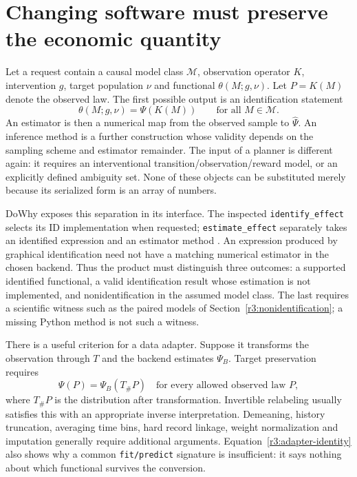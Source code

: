 \section{Changing software must preserve the economic quantity}
\label{r3:software-types}

Let a request contain a causal model class $\mathcal M$, observation operator
$K$, intervention $g$, target population $\nu$ and functional
$\theta(M;g,\nu)$. Let $P=K(M)$ denote the observed law. The first possible
output is an identification statement
\[
 \theta(M;g,\nu)=\Psi(K(M))\qquad\text{for all }M\in\mathcal M.
\]
An estimator is then a numerical map from the observed sample to
$\widehat\Psi$. An inference method is a further construction whose
validity depends on the sampling scheme and estimator remainder.
The input of a planner is different again: it requires an interventional
transition/observation/reward model, or an explicitly defined ambiguity set.
None of these objects can be substituted merely because its serialized
form is an array of numbers.

DoWhy exposes this separation in its interface. The inspected
\texttt{identify\_effect} selects its ID implementation when requested;
\texttt{estimate\_effect} separately takes an identified expression and
an estimator method \citep{sw_dowhy}. An expression produced by graphical
identification need not have a matching numerical estimator in the chosen
backend. Thus the product must distinguish three outcomes: a supported
identified functional, a valid identification result whose estimation is
not implemented, and nonidentification in the assumed model class.
The last requires a scientific witness such as the paired models of
Section~\ref{r3:nonidentification}; a missing Python method is not such a
witness.

There is a useful criterion for a data adapter. Suppose it transforms the
observation through $T$ and the backend estimates $\Psi_B$. Target
preservation requires
\begin{equation}
 \Psi(P)=\Psi_B(T_\#P)
 \quad\text{for every allowed observed law }P,
 \label{r3:adapter-identity}
\end{equation}
where $T_\#P$ is the distribution after transformation. Invertible relabeling
usually satisfies this with an appropriate inverse interpretation.
Demeaning, history truncation, averaging time bins, hard record linkage,
weight normalization and imputation generally require additional arguments.
Equation~\eqref{r3:adapter-identity} also shows why a common
\texttt{fit/predict} signature is insufficient: it says nothing about
which functional survives the conversion.


